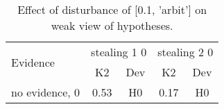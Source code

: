 \begin{table}\begin{tabular}{l|cc|cc}\toprule\multirow{2}{*}{Evidence} & \multicolumn{2}{c}{stealing 1 0}& \multicolumn{2}{c}{stealing 2 0}\\& {K2} & {Dev}& {K2} & {Dev}\\\midrule
no evidence, 0 & \cellcolor{Bittersweet}0.53&\cellcolor{Bittersweet}H0&\cellcolor{Bittersweet}0.17&\cellcolor{Bittersweet}H0\\\bottomrule\end{tabular}\caption{Effect of disturbance of [0.1, 'arbit'] on weak view of hypotheses.}\end{table}
